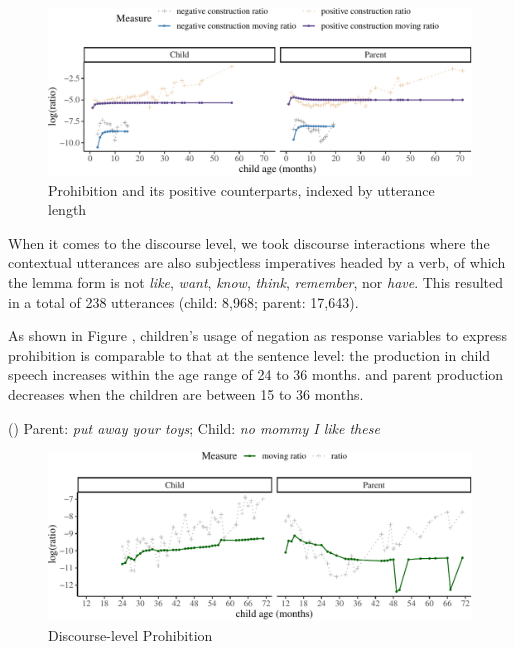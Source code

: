 \documentclass[
  english,
  man,floatsintext]{apa6}
\begin{document}
\begin{figure}[H]

{\centering \includegraphics{neg_construction_article_files/figure-latex/prohibitionul-1} 

}

\caption{Prohibition and its positive counterparts, indexed by utterance length}\label{fig:prohibitionul}
\end{figure}

When it comes to the discourse level, we took discourse interactions where the contextual utterances are also subjectless imperatives headed by a verb, of which the lemma form is not \emph{like}, \emph{want}, \emph{know}, \emph{think}, \emph{remember}, nor \emph{have}. This resulted in a total of 238 utterances (child: 8,968; parent: 17,643).

As shown in Figure , children's usage of negation as response variables to express prohibition is comparable to that at the sentence level: the production in child speech increases within the age range of 24 to 36 months. and parent production decreases when the children are between 15 to 36 months.

() Parent: \emph{put away your toys}; Child: \emph{no mommy I like these}

\begin{figure}[H]

{\centering \includegraphics{neg_construction_article_files/figure-latex/prohibitiondiscourse-1} 

}

\caption{Discourse-level Prohibition}\label{fig:prohibitiondiscourse}
\end{figure}
\end{document}
